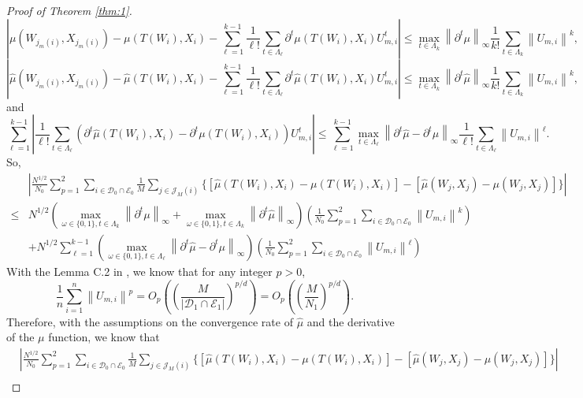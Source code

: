 \documentclass[11pt]{article}
\numberwithin{equation}{section}
\theoremstyle{definition}
\begin{document}
\begin{proof}[Proof of Theorem \ref{thm:1}]
\[\left| \mu (W_{j_m(i)},X_{j_m(i)}) - \mu (T(W_i),X_i) - \sum_{\ell=1}^{k-1} \frac{1}{\ell!} \sum_{t \in \Lambda_\ell} \partial^t \mu (T(W_i),X_i) U_{m,i}^t \right| \leq \max_{t \in \Lambda_k} \left\| \partial^t \mu \right\|_\infty \frac{1}{k!} \sum_{t \in \Lambda_k} \left\| U_{m,i} \right\|^k,\]
\[\left| \hat{\mu} (W_{j_m(i)},X_{j_m(i)}) - \hat{\mu} (T(W_i),X_i) - \sum_{\ell=1}^{k-1} \frac{1}{\ell!} \sum_{t \in \Lambda_\ell} \partial^t \hat{\mu} (T(W_i),X_i) U_{m,i}^t \right| \leq \max_{t \in \Lambda_k} \left\| \partial^t \hat{\mu} \right\|_\infty \frac{1}{k!} \sum_{t \in \Lambda_k} \left\| U_{m,i} \right\|^k,\]
and
\[\sum_{\ell=1}^{k-1} \left| \frac{1}{\ell!} \sum_{t \in \Lambda_\ell} (\partial^t \hat{\mu} (T(W_i),X_i) - \partial^t \mu (T(W_i),X_i)) U_{m,i}^t \right| \leq \sum_{\ell=1}^{k-1} \max_{t \in \Lambda_\ell} \left\| \partial^t \hat{\mu} - \partial^t \mu \right\|_\infty \frac{1}{\ell!} \sum_{t \in \Lambda_\ell} \left\| U_{m,i} \right\|^\ell.\]
So,
\begin{align*}
&\left|\frac{N^{1/2}}{N_0}\sum_{p=1}^2\sum_{i\in \mathcal{D}_0\cap\mathcal{E}_0}\frac{1}{M}\sum_{j\in\mathcal{J}_M(i)}\{[\widehat{\mu}(T(W_i),X_i)-\mu(T(W_i),X_i)]-[\widehat{\mu}(W_j,X_j)-\mu(W_j,X_j)]\}\right| \\
\leq& N^{1/2}\left( \max_{\omega \in \{0,1\}, t \in \Lambda_k} \left\| \partial^t \mu \right\|_\infty + \max_{\omega \in \{0,1\}, t \in \Lambda_k} \left\| \partial^t \hat{\mu} \right\|_\infty \right) \left( \frac{1}{N_0} \sum_{p=1}^2\sum_{i\in\mathcal{D}_0\cap\mathcal{E}_0} \left\| U_{m,i} \right\|^k \right)\\
&+ N^{1/2}\sum_{\ell=1}^{k-1} \left( \max_{\omega \in \{0,1\}, t \in \Lambda_\ell} \left\| \partial^t \hat{\mu} - \partial^t \mu \right\|_\infty \right) \left( \frac{1}{N_0} \sum_{p=1}^2\sum_{i\in\mathcal{D}_0\cap\mathcal{E}_0}\left\| U_{m,i} \right\|^\ell \right)
\end{align*}
With the Lemma C.2 in \cite{lin2023estimation}, we know that for any integer $p>0$,
\[\frac{1}{n} \sum_{i=1}^n \left\| U_{m,i} \right\|^p = O_p \left( \left( \frac{M}{|\mathcal{D}_1\cap\mathcal{E}_1|} \right)^{p/d} \right)=O_p \left( \left( \frac{M}{N_1} \right)^{p/d} \right).\]
Therefore, with the assumptions on the convergence rate of $\hat{\mu}$ and the derivative of the $\mu$ function, we know that
\begin{align*}
&\left|\frac{N^{1/2}}{N_0}\sum_{p=1}^2\sum_{i\in \mathcal{D}_0\cap\mathcal{E}_0}\frac{1}{M}\sum_{j\in\mathcal{J}_M(i)}\{[\widehat{\mu}(T(W_i),X_i)-\mu(T(W_i),X_i)]-[\widehat{\mu}(W_j,X_j)-\mu(W_j,X_j)]\}\right| \\

\end{align*}
\end{proof}
\end{document}
